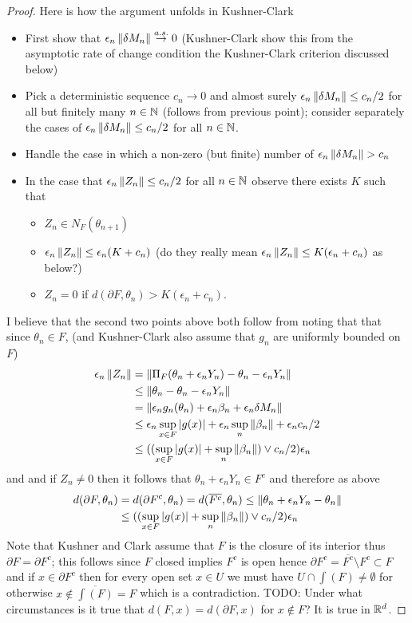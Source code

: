 \begin{proof}
Here is how the argument unfolds in Kushner-Clark
\begin{itemize}
\item First show that $\epsilon_n \left \lVert \delta M_n \right \rVert \overset{a.s.}\to 0$ (Kushner-Clark show this from the asymptotic rate of change condition the Kushner-Clark criterion discussed below)
\item Pick a deterministic sequence $c_n \to 0$ and almost surely $\epsilon_n \left \lVert \delta M_n \right \rVert\leq c_n/2$ for all but finitely many $n \in \mathbb{N}$ (follows from previous point); consider separately the cases of $\epsilon_n \left \lVert \delta M_n \right \rVert \leq c_n/2$ for all $n \in \mathbb{N}$.
\item Handle the case in which a non-zero (but finite) number of $\epsilon_n \left \lVert \delta M_n \right \rVert > c_n$
\item In the case that $\epsilon_n \left \lVert Z_n \right \rVert \leq c_n/2$ for all $n \in \mathbb{N}$ observe there exists $K$ such that
\begin{itemize}
\item $Z_n \in N_F(\theta_{n+1})$
\item $\epsilon_n \left \lVert Z_n \right \rVert \leq \epsilon_n(K + c_n)$ (do they really mean $\epsilon_n \left \lVert Z_n \right \rVert \leq K(\epsilon_n + c_n)$ as below?)
\item $Z_n=0$ if $d(\partial F, \theta_n) > K(\epsilon_n + c_n)$.
\end{itemize}
\end{itemize}
I believe that the second two points above both follow from noting that that since $\theta_n \in F$, (and Kushner-Clark also assume that $g_n$ are uniformly bounded on $F$)
\begin{align*}
\epsilon_n \left \lVert Z_n \right \rVert &= \left \lVert \Pi_F(\theta_n + \epsilon_n Y_n) - \theta_n - \epsilon_n Y_n \right \rVert \\
&\leq \left \lVert \theta_n - \theta_n - \epsilon_n Y_n \right \rVert \\
&= \left \lVert \epsilon_n g_n(\theta_n) + \epsilon_n \beta_n + \epsilon_n \delta M_n  \right \rVert \\
&\leq \epsilon_n \sup_{x \in F} \left \vert g(x) \right \vert + \epsilon_n \sup_n\left \lVert \beta_n \right \rVert + \epsilon_n c_n/2 \\
&\leq ((\sup_{x \in F} \left \vert g(x) \right \vert + \sup_n\left \lVert \beta_n \right \rVert) \vee c_n/2) \epsilon_n
\end{align*}
and and if $Z_n \neq 0$ then it follows that $\theta_n + \epsilon_n Y_n \in F^c$ and  therefore as above
\begin{align*}
d(\partial F, \theta_n) &=d(\partial F^c, \theta_n) = d(\overline{F^c}, \theta_n) \leq \left \lVert \theta_n + \epsilon_n Y_n -\theta_n \right \rVert \\
&\leq  ((\sup_{x \in F} \left \vert g(x) \right \vert + \sup_n\left \lVert \beta_n \right \rVert) \vee c_n/2) \epsilon_n
\end{align*}
Note that Kushner and Clark assume that $F$ is the closure of its interior thus $\partial F = \partial F^c$; this follows since $F$ closed implies $F^c$ is open
hence $\partial F^c = \overline{F^c} \setminus F^c \subset F$ and if $x \in \partial F^c$ then for every open set $x \in U$ we must have $U \cap \int(F) \neq \emptyset$ for otherwise 
$x \notin \overline{\int(F)} = F$ which is a contradiction.  TODO: Under what circumstances is it true that $d(F,x) = d(\partial F, x)$ for $x \notin F$?  It is true in $\mathbb{R}^d$.


\end{proof}
